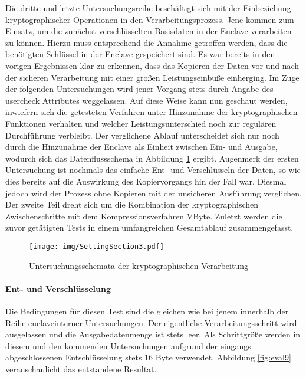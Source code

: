 Die dritte und letzte Untersuchungsreihe beschäftigt sich mit der Einbeziehung kryptographischer Operationen in den Verarbeitungsprozess. Jene kommen zum Einsatz, um die zunächst verschlüsselten Basisdaten in der Enclave verarbeiten zu können. Hierzu muss entsprechend die Annahme getroffen werden, dass die benötigten Schlüssel in der Enclave gespeichert sind. Es war bereits in den vorigen Ergebnissen klar zu erkennen, dass das Kopieren der Daten vor und nach der sicheren Verarbeitung mit einer großen Leistungseinbuße einherging. Im Zuge der folgenden Untersuchungen wird jener Vorgang stets durch Angabe des user\textunderscore check Attributes weggelassen. Auf diese Weise kann nun geschaut werden, inwiefern sich die getesteten Verfahren unter Hinzunahme der kryptographischen Funktionen verhalten und welcher Leistungsunterschied noch zur regulären Durchführung verbleibt. Der verglichene Ablauf unterscheidet sich nur noch durch die Hinzunahme der Enclave als Einheit zwischen Ein- und Ausgabe, wodurch sich das Datenflussschema in Abbildung \ref{fig:settingsection3} ergibt. Augenmerk der ersten Untersuchung ist nochmals das einfache Ent- und Verschlüsseln der Daten, so wie dies bereits auf die Auswirkung des Kopiervorgangs hin der Fall war. Diesmal jedoch wird der Prozess ohne Kopieren mit der unsicheren Ausführung verglichen. Der zweite Teil dreht sich um die Kombination der kryptographischen Zwischenschritte mit dem Kompressionsverfahren VByte. Zuletzt werden die zuvor getätigten Tests in einem umfangreichen Gesamtablauf zusammengefasst.

\begin{figure}[h]
	\texttt{[image: img/SettingSection3.pdf]}
	\centering
	\caption{Untersuchungsschemata der kryptographischen Verarbeitung}
	\label{fig:settingsection3}
\end{figure}

\paragraph{Ent- und Verschlüsselung}

Die Bedingungen für diesen Test sind die gleichen wie bei jenem innerhalb der Reihe enclaveinterner Untersuchungen. Der eigentliche Verarbeitungsschritt wird ausgelassen und die Ausgabedatenmenge ist stets leer. Als Schrittgröße werden in diesem und den kommenden Untersuchungen aufgrund der eingangs abgeschlossenen Entschlüsselung stets 16 Byte verwendet. Abbildung \ref{fig:eval9} veranschaulicht das entstandene Resultat.

